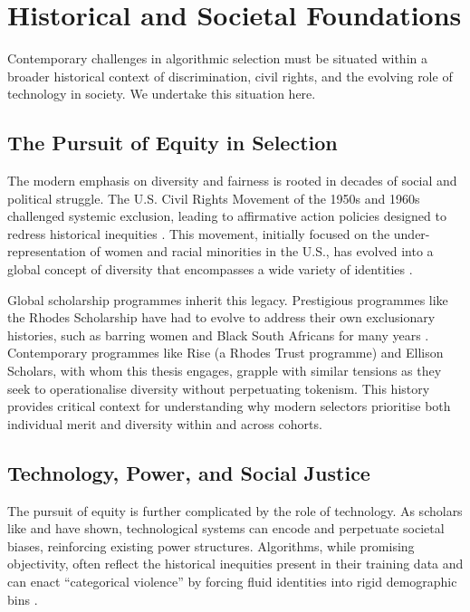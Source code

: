 \section{Historical and Societal Foundations}\label{sec:context_historical_societal}
Contemporary challenges in algorithmic selection must be situated within a broader historical context of discrimination, civil rights, and the evolving role of technology in society. We undertake this situation here.

\subsection{The Pursuit of Equity in Selection}\label{ssec:context_equity}
The modern emphasis on diversity and fairness is rooted in decades of social and political struggle. The U.S. Civil Rights Movement of the 1950s and 1960s challenged systemic exclusion, leading to affirmative action policies designed to redress historical inequities \cite{morris1984origins, anderson2010imperative}. This movement, initially focused on the under-representation of women and racial minorities in the U.S., has evolved into a global concept of diversity that encompasses a wide variety of identities \cite{nkomo2019diversity}.

Global scholarship programmes inherit this legacy. Prestigious programmes like the Rhodes Scholarship have had to evolve to address their own exclusionary histories, such as barring women and Black South Africans for many years \cite{Ziegler_2008}. Contemporary programmes like Rise (a Rhodes Trust programme) and Ellison Scholars, with whom this thesis engages, grapple with similar tensions as they seek to operationalise diversity without perpetuating tokenism. This history provides critical context for understanding why modern selectors prioritise both individual merit and diversity within and across cohorts.

\subsection{Technology, Power, and Social Justice}\label{ssec:context_tech_power}
The pursuit of equity is further complicated by the role of technology. As scholars like \textcite{benjamin2019race} and \textcite{noble2018algorithms} have shown, technological systems can encode and perpetuate societal biases, reinforcing existing power structures. Algorithms, while promising objectivity, often reflect the historical inequities present in their training data and can enact ``categorical violence'' by forcing fluid identities into rigid demographic bins \cite{scheuerman2019computers, bowker1999sorting}.

